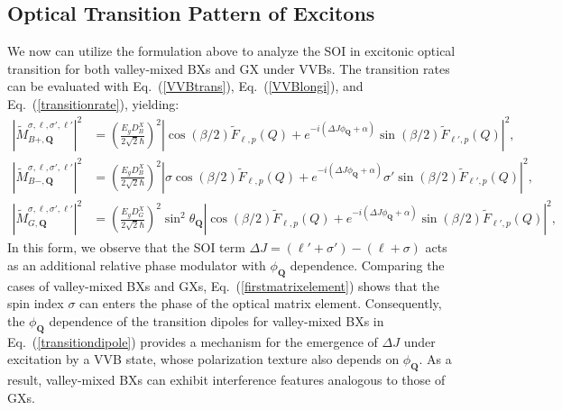 \subsection{Optical Transition Pattern of Excitons}
We now can utilize the formulation above to analyze the SOI in excitonic optical transition for both valley-mixed BXs and GX under VVBs. The transition rates can be evaluated with Eq.~(\ref{VVBtrans}), Eq.~(\ref{VVBlongi}), and Eq.~(\ref{transitionrate}), yielding:
\begin{equation}
\begin{aligned}
\left|\tilde{M}^{\sigma, \ell, \sigma', \ell'}_{B+, \boldsymbol{Q}}\right|^2
&=\left( \frac{E_g D^X_B}{2\sqrt{2}\hbar} \right)^2
 \left| \cos(\beta/2)\tilde{F}_{\ell, p}(Q) + e^{-i(\Delta J \phi_{\boldsymbol{Q}} + \alpha)} \sin(\beta/2)\tilde{F}_{\ell', p}(Q) \right|^2, \\
\left|\tilde{M}^{\sigma, \ell, \sigma', \ell'}_{B-, \boldsymbol{Q}}\right|^2
&=\left( \frac{E_g D^X_B}{2\sqrt{2}\hbar} \right)^2
\left| \sigma\cos(\beta/2)\tilde{F}_{\ell, p}(Q) + e^{-i(\Delta J \phi_{\boldsymbol{Q}} + \alpha)} \sigma'\sin(\beta/2)\tilde{F}_{\ell', p}(Q) \right|^2, \\
\left|\tilde{M}^{\sigma, \ell, \sigma', \ell'}_{G, \boldsymbol{Q}}\right|^2
&=\left( \frac{E_g D^X_G}{2\sqrt{2}\hbar} \right)^2
\sin^2 \theta_{\boldsymbol{Q}} \left| \cos(\beta/2)\tilde{F}_{\ell, p}(Q) + e^{-i(\Delta J \phi_{\boldsymbol{Q}} + \alpha)} \sin(\beta/2)\tilde{F}_{\ell', p}(Q) \right|^2,
\end{aligned}
\label{eq:transition_rates_complex}
\end{equation}
In this form, we observe that the SOI term $\Delta J = (\ell' + \sigma') - (\ell + \sigma)$ acts as an additional relative phase modulator with $\phi_{\boldsymbol{Q}}$ dependence. Comparing the cases of valley-mixed BXs and GXs, Eq.~(\ref{firstmatrixelement}) shows that the spin index $\sigma$ can enters the phase of the optical matrix element. Consequently, the $\phi_{\boldsymbol{Q}}$ dependence of the transition dipoles for valley-mixed BXs in Eq.~(\ref{transitiondipole}) provides a mechanism for the emergence of $\Delta J$ under excitation by a VVB state, whose polarization texture also depends on $\phi_{\boldsymbol{Q}}$. As a result, valley-mixed BXs can exhibit interference features analogous to those of GXs.

